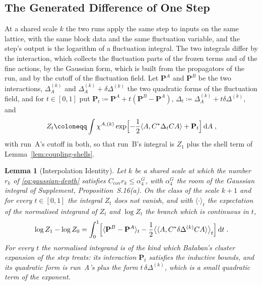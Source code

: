 \documentclass[11pt]{preprint}
\newcommand{\dd}{\mathrm{d}}
\numberwithin{equation}{section}
\newtheorem{lemma}[theorem]{Lemma}
\theoremstyle{definition}
\theoremstyle{remark}
\theoremstyle{plain}
\begin{document}
\subsection{The Generated Difference of One Step}\label{sec:recursion}

At a shared scale $k$ the two runs apply the same step to inputs on the same lattice, with the same block data and the same fluctuation variable, and the step's output is the logarithm of a fluctuation integral. The two integrals differ by the interaction, which collects the fluctuation parts of the frozen terms and of the fine actions, by the Gaussian form, which is built from the propagators of the run, and by the cutoff of the fluctuation field. Let $\mathbf P^A$ and $\mathbf P^B$ be the two interactions, $\Delta^{(k)}_A$ and $\Delta^{(k)}_A + \delta\Delta^{(k)}$ the two quadratic forms of the fluctuation field, and for $t \in [0, 1]$ put $\mathbf P_t \coloneqq \mathbf P^A + t(\mathbf P^B - \mathbf P^A)$, $\Delta_t \coloneqq \Delta^{(k)}_A + t\delta\Delta^{(k)}$, and
\begin{equation}\label{eq:interpolated-integral}
    Z_t \coloneqq \int\chi^{A,(k)}\exp\Bigl[-\frac12\langle A, C^*\Delta_tCA\rangle + \mathbf P_t\Bigr]\,\dd A\;,
\end{equation}
with run~A's cutoff in both, so that run~B's integral is $Z_1$ plus the shell term of Lemma~\ref{lem:coupling-shells}.

\begin{lemma}[Interpolation Identity]\label{lem:interpolation}
Let $k$ be a shared scale at which the number $r_k$ of \eqref{eq:gaussian-depth} satisfies $C_{\mathrm{cov}}r_k \leq \alpha^G_4$, with $\alpha^G_4$ the room of the Gaussian integral of Supplement, Proposition~S.16(a). On the class of the scale $k + 1$ and for every $t \in [0, 1]$ the integral $Z_t$ does not vanish, and with $\langle\cdot\rangle_t$ the expectation of the normalised integrand of $Z_t$ and $\log Z_t$ the branch which is continuous in $t$,
\begin{equation}\label{eq:interpolation-identity}
    \log Z_1 - \log Z_0 = \int_0^1\Bigl[\langle\mathbf P^B - \mathbf P^A\rangle_t - \frac12\bigl\langle\langle A, C^*\delta\Delta^{(k)}CA\rangle\bigr\rangle_t\Bigr]\,\dd t\;.
\end{equation}
For every $t$ the normalised integrand is of the kind which Ba{\l}aban's cluster expansion of the step treats: its interaction $\mathbf P_t$ satisfies the inductive bounds, and its quadratic form is run~A's plus the form $t\,\delta\Delta^{(k)}$, which is a small quadratic term of the exponent.
\end{lemma}
\end{document}
